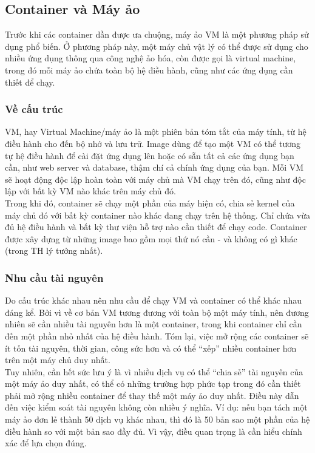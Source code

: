 \documentclass[14pt,a4paper]{book}
\begin{document}
			\subsection{Container và Máy ảo}
		\hspace{0.6cm}Trước khi các container dần được ưa chuộng, máy ảo VM là một phương pháp sử dụng phổ biến. Ở phương pháp này, một máy chủ vật lý có thể được sử dụng cho nhiều ứng dụng thông qua công nghệ ảo hóa, còn được gọi là virtual machine, trong đó mỗi máy ảo chứa toàn bộ hệ điều hành, cũng như các ứng dụng cần thiết để chạy.
				\subsubsection{Về cấu trúc}
		\hspace{0.6cm}VM, hay Virtual Machine/máy ảo là một phiên bản tóm tắt của máy tính, từ hệ điều hành cho đến bộ nhớ và lưu trữ. Image dùng để tạo một VM có thể tương tự hệ điều hành để cài đặt ứng dụng lên hoặc có sẵn tất cả các ứng dụng bạn cần, như web server và database, thậm chí cả chính ứng dụng của bạn. Mỗi VM sẽ hoạt động độc lập hoàn toàn với máy chủ mà VM chạy trên đó, cũng như độc lập với bất kỳ VM nào khác trên máy chủ đó.\\

		Trong khi đó, container sẽ chạy một phần của máy hiện có, chia sẻ kernel của máy chủ đó với bất kỳ container nào khác đang chạy trên hệ thống. Chỉ chứa vừa đủ hệ điều hành và bất kỳ thư viện hỗ trợ nào cần thiết để chạy code. Container được xây dựng từ những image bao gồm mọi thứ nó cần - và không có gì khác (trong TH lý tưởng nhất).
				\subsubsection{Nhu cầu tài nguyên}
		\hspace{0.6cm}Do cấu trúc khác nhau nên nhu cầu để chạy VM và container có thể khác nhau đáng kể. Bởi vì về cơ bản VM tương đương với toàn bộ một máy tính, nên đương nhiên sẽ cần nhiều tài nguyên hơn là một container, trong khi container chỉ cần đến một phần nhỏ nhất của hệ điều hành. Tóm lại, việc mở rộng các container sẽ ít tốn tài nguyên, thời gian, công sức hơn và có thể “xếp” nhiều container hơn trên một máy chủ duy nhất.\\
		
		Tuy nhiên, cần hết sức lưu ý là vì nhiều dịch vụ có thể “chia sẻ” tài nguyên của một máy ảo duy nhất, có thể có những trường hợp phức tạp trong đó cần thiết phải mở rộng nhiều container để thay thế một máy ảo duy nhất. Điều này dẫn đến việc kiểm soát tài nguyên không còn nhiều ý nghĩa. Ví dụ: nếu bạn tách một máy ảo đơn lẻ thành 50 dịch vụ khác nhau, thì đó là 50 bản sao một phần của hệ điều hành so với một bản sao đầy đủ. Vì vậy, điều quan trọng là cần hiểu chính xác để lựa chọn đúng.\\
		
\end{document}
